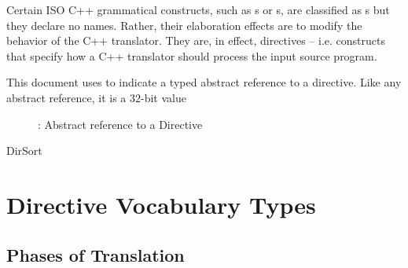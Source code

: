 \label{sec:ifc-directives}

Certain ISO C++ grammatical constructs, such as s or s, are classified as s but they declare no names.
Rather, their elaboration effects are to modify the behavior of the C++ translator.  They are, in effect, directives -- i.e. constructs that specify how a C++ 
translator should process the input source program.

This document uses  to indicate a typed abstract reference to a directive.
Like any abstract reference, it is a $32$-bit value
\begin{figure}[htbp]
    \centering
    \caption{: Abstract reference to a Directive}
    \label{fig:ifc-dir-index}
\end{figure}

\begin{SortEnum}{DirSort}

\end{SortEnum}


\section{Directive Vocabulary Types}
\label{sec:ifc-dir-support-types}

\subsection{Phases of Translation}
\label{sec:ifc-translation-phases-type}

